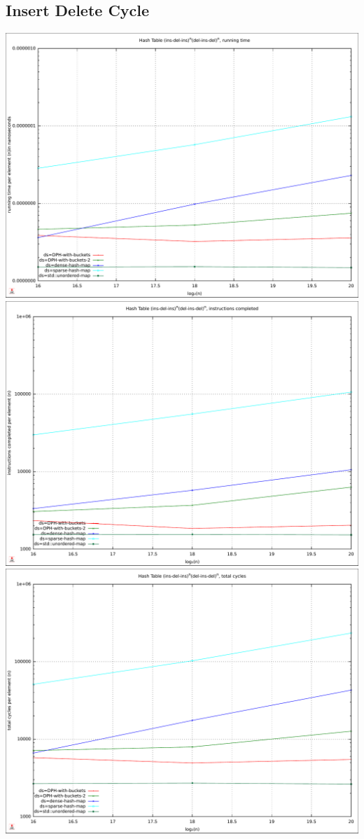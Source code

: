 \documentclass{article}
\begin{document}
\subsection*{Insert Delete Cycle}
\centering
\includegraphics[width=\linewidth]{img/hash_ins-del-cycle_time}
\includegraphics[width=\linewidth]{img/hash_ins-del-cycle_instructions}
\includegraphics[width=\linewidth]{img/hash_ins-del-cycle_cycles}
\end{document}
